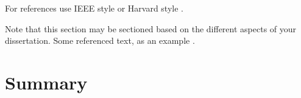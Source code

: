 For references use IEEE style \cite{einstein} or Harvard style \cite{HarvRefStyle}.

Note that this section may be sectioned based on the different aspects of your dissertation.  Some referenced text, as an example \cite{Arrighi2003, WithersMartinez2012, Ebejer2016}.

\section{Summary}
\blindtext[3]
